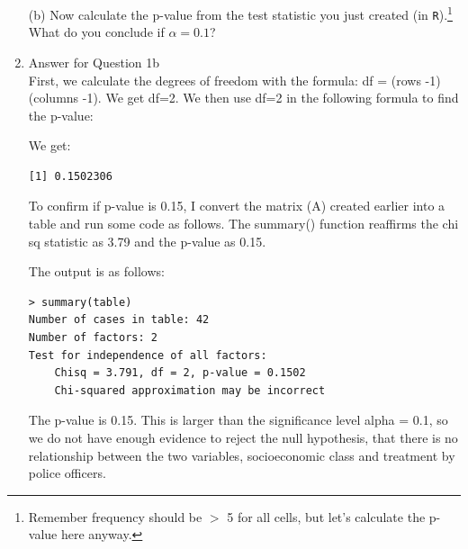 \documentclass[12pt,letterpaper]{article}
\begin{document}
\begin{enumerate}
\vspace{.5cm}
  
\vspace{.5cm}
\ The chi square is:\\
\begin{verbatim}
[1] 3.791168
\end{verbatim}
\vspace{.3cm}
\noindent To check if the answer 'by hand' is correct, we can run the chisq.test() function on A and we get chi square = 3.7912:\\
\begin{verbatim}
	Pearson's Chi-squared test

data:  A
X-squared = 3.7912, df = 2, p-value = 0.1502
\end{verbatim}
\vspace{.3cm}

	\item [(b)]
	Now calculate the p-value from the test statistic you just created (in \texttt{R}).\footnote{Remember frequency should be $>$ 5 for all cells, but let's calculate the p-value here anyway.}  What do you conclude if $\alpha = 0.1$?\\
	
		\item
Answer for Question 1b\\
\noindent First, we calculate the degrees of freedom with the formula: df = (rows -1)(columns -1). We get df=2. We then use df=2 in the following formula to find the p-value:\\
\vspace{.5cm}
  
\vspace{.5cm}
\noindent We get:\\
\begin{verbatim}
[1] 0.1502306
\end{verbatim}
\noindent To confirm if p-value is 0.15, I convert the matrix (A) created earlier into a table and run some code as follows. The summary() function reaffirms the chi sq statistic as 3.79 and the p-value as 0.15.\\
\vspace{.5cm}
  
\vspace{.5cm}
\noindent The output is as follows:\\
\begin{verbatim}
> summary(table)
Number of cases in table: 42 
Number of factors: 2 
Test for independence of all factors:
	Chisq = 3.791, df = 2, p-value = 0.1502
	Chi-squared approximation may be incorrect
\end{verbatim}
\noindent The p-value is 0.15. This is larger than the significance level alpha = 0.1, so we do not have enough evidence to reject the null hypothesis, that there is no relationship between the two variables, socioeconomic class and treatment by police officers.\\
	

\end{enumerate}
\end{document}
